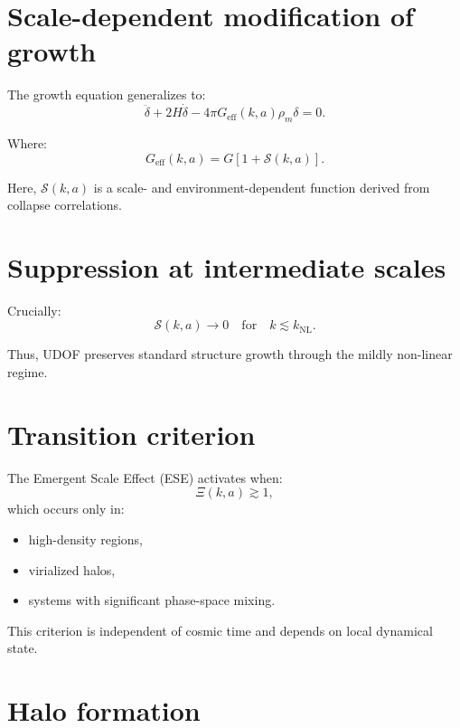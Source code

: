 \documentclass[11pt]{book}
\begin{document}
\section{Scale-dependent modification of growth}

The growth equation generalizes to:
\begin{equation}
\ddot{\delta} + 2H\dot{\delta}
- 4\pi G_{\mathrm{eff}}(k,a)\rho_m \delta = 0.
\end{equation}

Where:
\begin{equation}
G_{\mathrm{eff}}(k,a) =
G\left[1 + \mathcal{S}(k,a)\right].
\end{equation}

Here, $\mathcal{S}(k,a)$ is a scale- and environment-dependent function
derived from collapse correlations.

\section{Suppression at intermediate scales}

Crucially:
\begin{equation}
\mathcal{S}(k,a) \to 0
\quad
\text{for}
\quad
k \lesssim k_{\mathrm{NL}}.
\end{equation}

Thus, UDOF preserves standard structure growth through the mildly
non-linear regime.

\section{Transition criterion}

The Emergent Scale Effect (ESE) activates when:
\begin{equation}
\Xi(k,a) \gtrsim 1,
\end{equation}
which occurs only in:
\begin{itemize}
\item high-density regions,
\item virialized halos,
\item systems with significant phase-space mixing.
\end{itemize}

This criterion is independent of cosmic time and depends on local
dynamical state.

\section{Halo formation}
\end{document}
